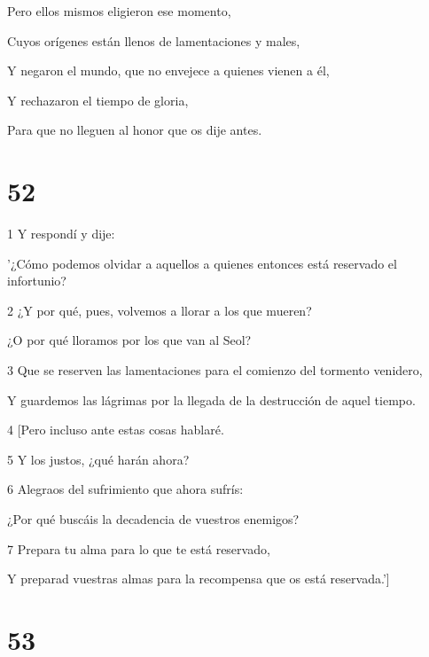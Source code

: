 \par Pero ellos mismos eligieron ese momento,

\par Cuyos orígenes están llenos de lamentaciones y males,

\par Y negaron el mundo, que no envejece a quienes vienen a él,

\par Y rechazaron el tiempo de gloria,

\par Para que no lleguen al honor que os dije antes.

\chapter{52}

\par 1 Y respondí y dije:

\par '¿Cómo podemos olvidar a aquellos a quienes entonces está reservado el infortunio?

\par 2 ¿Y por qué, pues, volvemos a llorar a los que mueren?

\par ¿O por qué lloramos por los que van al Seol?

\par 3 Que se reserven las lamentaciones para el comienzo del tormento venidero,

\par Y guardemos las lágrimas por la llegada de la destrucción de aquel tiempo.

\par 4 [Pero incluso ante estas cosas hablaré.

\par 5 Y los justos, ¿qué harán ahora?

\par 6 Alegraos del sufrimiento que ahora sufrís:

\par ¿Por qué buscáis la decadencia de vuestros enemigos?

\par 7 Prepara tu alma para lo que te está reservado,

\par Y preparad vuestras almas para la recompensa que os está reservada.']

\chapter{53}

